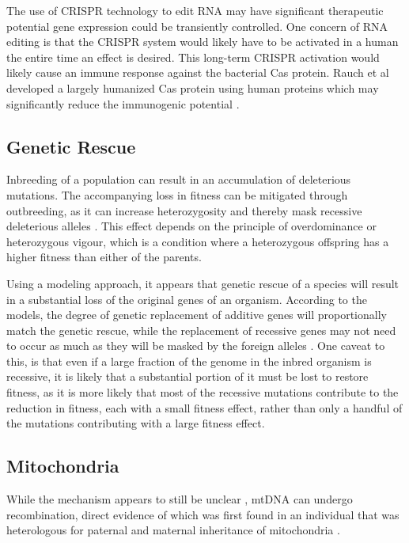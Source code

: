 \documentclass[]{book}
\begin{document}
The use of CRISPR technology to edit RNA may have significant therapeutic potential gene expression could be transiently controlled. One concern of RNA editing is that the CRISPR system would likely have to be activated in a human the entire time an effect is desired. This long-term CRISPR activation would likely cause an immune response against the bacterial Cas protein. Rauch et al developed a largely humanized Cas protein using human proteins which may significantly reduce the immunogenic potential \citep{rauch2019programmable}.

\hypertarget{genetic-rescue}{%
\subsection{Genetic Rescue}\label{genetic-rescue}}

Inbreeding of a population can result in an accumulation of deleterious mutations. The accompanying loss in fitness can be mitigated through outbreeding, as it can increase heterozygosity and thereby mask recessive deleterious alleles \citep{keller2002inbreeding, ingvarsson2001restoration, vila2003rescue}. This effect depends on the principle of overdominance or heterozygous vigour, which is a condition where a heterozygous offspring has a higher fitness than either of the parents.

Using a modeling approach, it appears that genetic rescue of a species will result in a substantial loss of the original genes of an organism. According to the models, the degree of genetic replacement of additive genes will proportionally match the genetic rescue, while the replacement of recessive genes may not need to occur as much as they will be masked by the foreign alleles \citep{Harris2019-sm}. One caveat to this, is that even if a large fraction of the genome in the inbred organism is recessive, it is likely that a substantial portion of it must be lost to restore fitness, as it is more likely that most of the recessive mutations contribute to the reduction in fitness, each with a small fitness effect, rather than only a handful of the mutations contributing with a large fitness effect.

\hypertarget{mitochondria}{%
\subsection{Mitochondria}\label{mitochondria}}

While the mechanism appears to still be unclear \citep{chen2013mechanism}, mtDNA can undergo recombination, direct evidence of which was first found in an individual that was heterologous for paternal and maternal inheritance of mitochondria \citep{kraytsberg2004recombination}.
\end{document}
